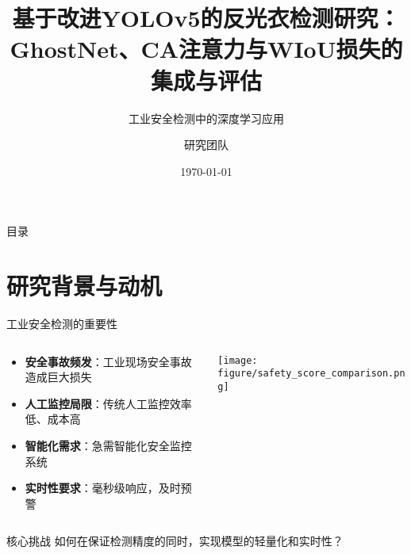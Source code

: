 \documentclass[aspectratio=169]{beamer}
\title[基于改进YOLOv5的反光衣检测研究]{基于改进YOLOv5的反光衣检测研究：\\GhostNet、CA注意力与WIoU损失的集成与评估}
\subtitle{工业安全检测中的深度学习应用}
\author{研究团队}
\institute{计算机科学与技术学院}
\date{\today}
\begin{document}
\begin{frame}
    \titlepage
\end{frame}

\begin{frame}{目录}
    \tableofcontents
\end{frame}

\section{研究背景与动机}

\begin{frame}{工业安全检测的重要性}
    \begin{columns}
        \begin{column}{0.6\textwidth}
            \begin{itemize}
                \item \textbf{安全事故频发}：工业现场安全事故造成巨大损失
                \item \textbf{人工监控局限}：传统人工监控效率低、成本高
                \item \textbf{智能化需求}：急需智能化安全监控系统
                \item \textbf{实时性要求}：毫秒级响应，及时预警
            \end{itemize}
        \end{column}
        \begin{column}{0.4\textwidth}
            \begin{center}
                \texttt{[image: figure/safety\_score\_comparison.png]}
            \end{center}
        \end{column}
    \end{columns}
    
    \vspace{0.5cm}
    \begin{alertblock}{核心挑战}
        如何在保证检测精度的同时，实现模型的轻量化和实时性？
    \end{alertblock}
\end{frame}
\end{document}
